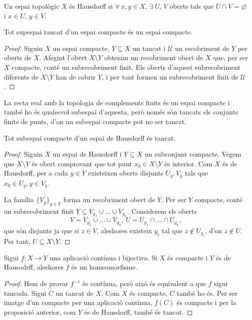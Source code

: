 \begin{defi}
    Un espai topològic $X$ \'es Hausdorff si $\forall \: x, y \in X, \, \exists \: U,\, V$
    oberts tals que $U \cap V = \varnothing$ i $x \in U,\, y \in V$.
\end{defi}
\begin{prop}
   Tot supespai tancat d'un espai compacte \'es un espai compacte. 
\end{prop}
\begin{proof}
    Siguin $X$ un espai compacte, $Y \subseteq X$ un tancat i $\mathcal{U}$ un recobriment
    de $Y$ per oberts de $X$. Afegint l'obert $X \setminus Y$ obtenim un 
    recobriment obert de $X$ que, per ser $X$ compacte, cont\'e un 
    subrecobriment finit. Els oberts d'aquest subrecobriment diferents 
    de $X \setminus Y$  han de cobrir $Y$, i per tant formen un subrecobriment finit de 
    $\mathcal{U}$.
\end{proof}
\begin{example}
    La recta real amb la topologia de complements finits \'es un espai compacte i tamb\'e ho
    \'es qualsevol subespai d'aquesta, però nom\'es són tancats els conjunts finits de punts,
    d'on un subespai compacte pot no ser tancat.
\end{example}
\begin{prop}
    Tot subespai compacte d'un espai de Hausdorff \'es tancat.
\end{prop}
\begin{proof}
    Siguin $X$ un espai de Hausdorff i $Y \subseteq X$ un subconjunt compacte. Vegem que
    $X \setminus Y$ \'es obert comprovant que tot punt $x_0 \in X \setminus Y$ \'es interior. Com $X$
    \'es de Hausdorff, per a cada $y \in Y$ existeixen oberts disjunts $U_y, V_y$ tals
    que $x_0 \in U_y, y \in V_y$.

    La família $\{V_y\}_{y \in Y}$ forma un recobriment obert de $Y$. Per ser $Y$ compacte,
    cont\'e un subrecobriment finit $Y \subseteq V_{y_1} \cup \dots \cup V_{y_n}$.
    Considerem els oberts
    \[ 
        V = V_{y_1} \cup \dots \cup V_{y_n}, \,
        U = U_{y_1} \cap \dots \cap U_{y_n},
    \]
    que són disjunts ja que si $z \in V$, aleshores 
    existeix $y_i$ tal que $z \not\in U_{y_i}$,
    d'on $z \not\in U$. Per tant, $U \subseteq X \setminus Y$.
\end{proof}
\begin{prop}
   Sigui $f : X \longrightarrow Y$ una aplicació contínua i bijectiva. Si $X$ \'es compacte
   i $Y$ \'es de Hausodrff, aleshores $f$ \'es un homeomorfisme.
\end{prop}
\begin{proof}
    Hem de provar $f^{-1}$ \'es contínua, però això \'es equivalent a que $f$ sigui tancada. 
    Sigui $C$ un tancat de $X$. Com $X$ \'es compacte, $C$ tamb\'e ho \'es. Per ser imatge
    d'un compacte per una aplicació contínua, $f(C)$ \'es compacte i per la
    proposició anterior, com $Y$ \'es de Hausdorff, tamb\'e \'es tancat.
\end{proof}


